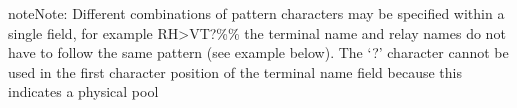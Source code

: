 \documentclass[letterpaper,10pt,english]{sphinxmanual}
\begin{document}
\begin{sphinxadmonition}{note}{Note:}
Different combinations of pattern characters may be specified within a single field, for example RH\textgreater{}VT?\%\% the terminal name and relay names do not have to follow the same pattern (see example below). The ‘?’ character cannot be used in the first character position of the terminal name field because this indicates a physical pool
\end{sphinxadmonition}

\begin{sphinxVerbatim}[commandchars=\\\{\}]
     
        
       
      
\end{sphinxVerbatim}
\end{document}

